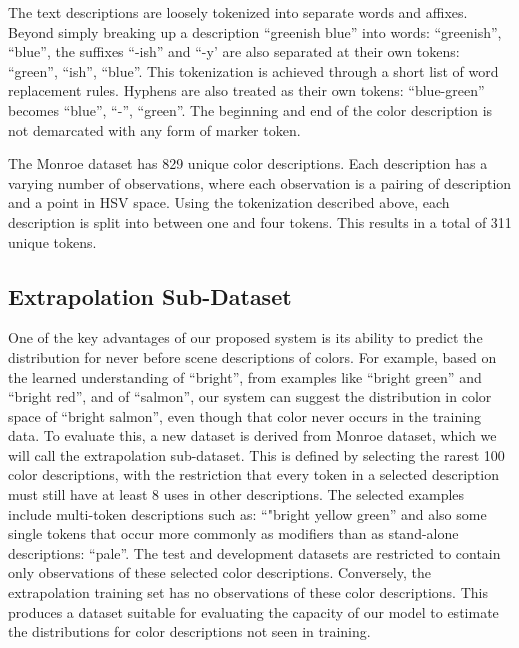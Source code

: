 \documentclass[11pt,letterpaper]{article}
\begin{document}
The text descriptions are loosely tokenized into separate words and affixes.
Beyond simply breaking up a description ``greenish blue'' into words: ``greenish'', ``blue'', the suffixes ``-ish'' and ``-y' are also separated at their own tokens: ``green'', ``ish'', ``blue''.
This tokenization is achieved through a short list of word replacement rules.
Hyphens are also treated as their own tokens: ``blue-green'' becomes ``blue'', ``-'', ``green''.
The beginning and end of the color description is not demarcated with any form of marker token.

The Monroe dataset has 829 unique color descriptions.
Each description has a varying number of observations, where each observation is a pairing of description and a point in HSV space.
Using the tokenization described above, each description is split into between one and four tokens.
This results in a total of 311 unique tokens.

\subsection{Extrapolation Sub-Dataset}
One of the key advantages of our proposed system is its ability to predict the distribution for never before scene descriptions of colors.
For example, based on the learned understanding of ``bright'', from examples like ``bright green'' and ``bright red'', and of ``salmon'', our system can suggest the distribution in color space of ``bright salmon'', even though that color never occurs in the training data.
To evaluate this, a new dataset is derived from Monroe dataset, which we will call the extrapolation sub-dataset.
This is defined by selecting the rarest 100 color descriptions,
with the restriction that every token in a selected description must still have at least 8 uses in other descriptions.
The selected examples include multi-token descriptions such as: ``"bright yellow green'' and also some single tokens that occur more commonly as modifiers than as stand-alone descriptions: ``pale''.
The test and development datasets are restricted to contain only observations of these selected color descriptions.
Conversely, the extrapolation training set has no observations of these color descriptions.
This produces a dataset suitable for evaluating the capacity of our model to estimate the distributions for color descriptions not seen in training.
\end{document}
